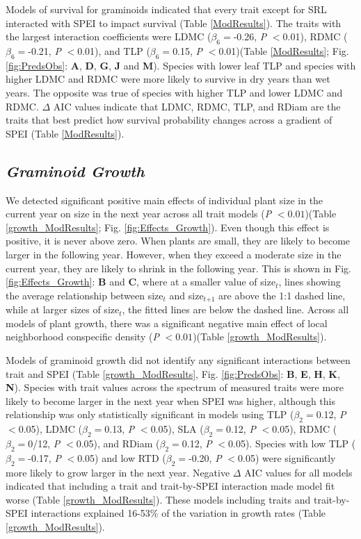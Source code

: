 \documentclass[12pt, letterpaper]{article}
\begin{document}
Models of survival for graminoids indicated that every trait except for SRL interacted with SPEI to impact survival (Table \ref{ModResults}). The traits with the largest interaction coefficients were LDMC ($\beta _6=$-0.26, \textit{P} $<$0.01), RDMC ($\beta _6=$-0.21, \textit{P} $<$0.01), and TLP ($\beta _6=$0.15, \textit{P} $<$0.01)(Table \ref{ModResults}; Fig. \ref{fig:PredsObs}: \textbf{A}, \textbf{D}, \textbf{G}, \textbf{J} and \textbf{M}). Species with lower leaf TLP and species with higher LDMC and RDMC were more likely to survive in dry years than wet years. The opposite was true of species with higher TLP and lower LDMC and RDMC. $\Delta$ AIC values indicate that LDMC, RDMC, TLP, and RDiam are the traits that best predict how survival probability changes across a gradient of SPEI (Table \ref{ModResults}).

\subsection{\textit{Graminoid Growth}} 
We detected significant positive main effects of individual plant size in the current year on size in the next year across all trait models (\textit{P} $<0.01$)(Table \ref{growth_ModResults}; Fig. \ref{fig:Effects_Growth}). Even though this effect is positive, it is never above zero. When plants are small, they are likely to become larger in the following year. However, when they exceed a moderate size in the current year, they are likely to shrink in the following year. This is shown in Fig. \ref{fig:Effects_Growth}: \textbf{B} and \textbf{C}, where at a smaller value of size$_{\textit{t}}$, lines showing the average relationship between size$_{\textit{t}}$ and size$_{\textit{t+1}}$ are above the 1:1 dashed line, while at larger sizes of size$_{\textit{t}}$, the fitted lines are below the dashed line. Across all models of plant growth, there was a significant negative main effect of local neighborhood conspecific density (\textit{P} $<0.01$)(Table \ref{growth_ModResults}).

Models of graminoid growth did not identify any significant interactions between trait and SPEI (Table \ref{growth_ModResults}, Fig. \ref{fig:PredsObs}: \textbf{B}, \textbf{E}, \textbf{H}, \textbf{K}, \textbf{N}). Species with trait values across the spectrum of measured traits were more likely to become larger in the next year when SPEI was higher, although this relationship was only statistically significant in models using TLP ($\beta _2=$0.12, \textit{P} $<$0.05), LDMC ($\beta _2=$0.13, \textit{P} $<$0.05), SLA ($\beta _2=$0.12, \textit{P} $<$0.05), RDMC ($\beta _2=$0/12, \textit{P} $<$0.05), and RDiam ($\beta _2=$0.12, \textit{P} $<$0.05). Species with low TLP ($\beta _2=$-0.17, \textit{P} $<$0.05) and low RTD ($\beta _2=$-0.20, \textit{P} $<$0.05) were significantly more likely to grow larger in the next year. Negative $\Delta$ AIC values for all models indicated that including a trait and trait-by-SPEI interaction made model fit worse (Table \ref{growth_ModResults}). These models including traits and trait-by-SPEI interactions explained 16-53\% of the variation in growth rates (Table \ref{growth_ModResults}). 
\end{document}
